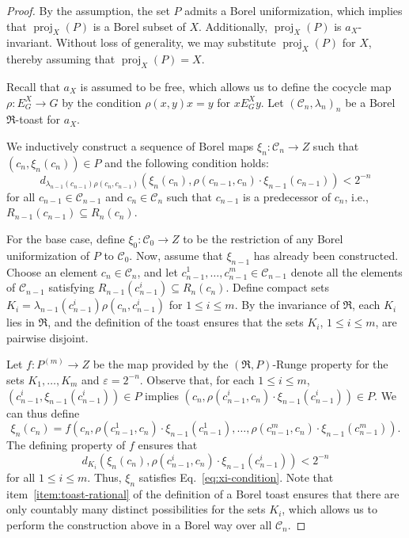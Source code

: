 \documentclass[12pt]{paper}
\numberwithin{equation}{section}
\theoremstyle{plain}
\theoremstyle{definition}
\newcommand{\mfR}{\mathfrak{R}}
\DeclareMathOperator{\proj}{\mathrm{proj}}
\renewcommand{\epsilon}{\varepsilon}
\begin{document}
\begin{proof}
  By the assumption, the set \(P\) admits a Borel uniformization, which implies that
  \(\proj_{X}(P)\) is a Borel subset of \(X\). Additionally, \(\proj_{X}(P)\) is
  \(a_{X}\)-invariant. Without loss of generality, we may substitute \(\proj_{X}(P)\) for \(X\),
  thereby assuming that \(\proj_{X}(P) = X\).

  Recall that \(a_{X}\) is assumed to be free, which allows us to define the cocycle map
  \(\rho : E_{G}^{X} \to G\) by the condition \(\rho(x, y)x = y\) for \(x E_{G}^{X} y\).  Let
  \((\mathcal{C}_{n}, \lambda_{n})_{n}\) be a Borel \(\mfR\)-toast for \(a_{X}\).

  We inductively construct a sequence of Borel maps \(\xi_{n} : \mathcal{C}_{n} \to Z\) such that
  \((c_{n}, \xi_{n}(c_{n})) \in P\) and the following condition holds:
  \begin{equation}
    \label{eq:xi-condition}
    d_{\lambda_{n-1}(c_{n-1})\rho(c_{n},c_{n-1})}(\xi_{n}(c_{n}),
    \rho(c_{n-1},c_{n})\cdot \xi_{n-1}(c_{n-1})) < 2^{-n}
  \end{equation}
  for all \(c_{n-1} \in \mathcal{C}_{n-1}\) and \(c_{n} \in \mathcal{C}_{n}\) such that \(c_{n-1} \)
  is a predecessor of \(c_{n}\), i.e., \(R_{n-1}(c_{n-1}) \subseteq R_{n}(c_{n})\).

  For the base case, define \(\xi_{0} : \mathcal{C}_{0} \to Z\) to be the restriction of any Borel
  uniformization of \(P\) to \(\mathcal{C}_{0}\). Now, assume that \(\xi_{n-1}\) has already been
  constructed. Choose an element \(c_{n} \in \mathcal{C}_{n}\), and let
  \(c_{n-1}^{1}, \ldots, c_{n-1}^{m} \in \mathcal{C}_{n-1}\) denote all the elements of
  \(\mathcal{C}_{n-1}\) satisfying \(R_{n-1}(c_{n-1}^{i}) \subseteq R_{n}(c_{n})\).  Define compact
  sets \(K_{i} = \lambda_{n-1}(c_{n-1}^{i})\rho(c_{n},c_{n-1}^{i})\) for \(1 \le i \le m\). By the
  invariance of \(\mfR\), each \(K_{i}\) lies in \(\mfR\), and the definition of the toast ensures
  that the sets \(K_{i}\), \(1 \le i \le m\), are pairwise disjoint.

  Let \(f : P^{(m)} \to Z\) be the map provided by the \((\mfR, P)\)-Runge property for the sets
  \(K_{1}, \ldots, K_{m}\) and \(\epsilon = 2^{-n}\). Observe that, for each \(1 \le i \le m\),
  \((c_{n-1}^{i}, \xi_{n-1}(c_{n-1}^{i})) \in P\) implies
  \((c_{n}, \rho(c_{n-1}^{i},c_{n})\cdot \xi_{n-1}(c_{n-1}^{i})) \in P\). We can thus define
  \[
    \xi_{n}(c_{n}) = f(c_{n}, \rho(c_{n-1}^{1},c_{n})\cdot \xi_{n-1}(c_{n-1}^{1}), \ldots,
    \rho(c_{n-1}^{m},c_{n})\cdot \xi_{n-1}(c_{n-1}^{m})).
  \]
  The defining property of \(f\) ensures that
  \[
    d_{K_{i}}(\xi_{n}(c_{n}), \rho(c_{n-1}^{i},c_{n})\cdot \xi_{n-1}(c_{n-1}^{i})) < 2^{-n}
  \]
  for all \(1 \le i \le m\).  Thus, \(\xi_{n}\) satisfies Eq.~\eqref{eq:xi-condition}.  Note that
  item~\eqref{item:toast-rational} of the definition of a Borel toast ensures that there are only
  countably many distinct possibilities for the sets \(K_{i}\), which allows us to perform the
  construction above in a Borel way over all \(\mathcal{C}_{n}\).


\end{proof}
\end{document}
